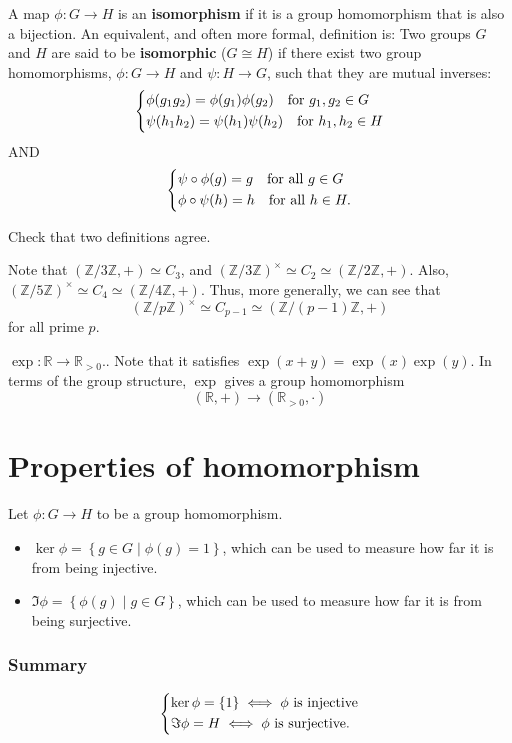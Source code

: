 \begin{definition}
A map $\phi: G \to H$ is an \textbf{isomorphism} if it is a group homomorphism that is also a bijection. An equivalent, and often more formal, definition is:
Two groups $G$ and $H$ are said to be \textbf{isomorphic} ($G \cong H$) if there exist two group homomorphisms, $\phi: G \to H$ and $\psi: H \to G$, such that they are mutual inverses:
\[
    \begin{dcases}
        \phi (g_1 g_2) = \phi (g_1) \phi (g_2) \quad \text{for } g_1, g_2 \in G \\
        \psi (h_1 h_2) = \psi (h_1) \psi (h_2) \quad \text{for } h_1, h_2 \in H
    \end{dcases}
\]
AND
\[
    \begin{dcases}
        \psi \circ \phi (g) = g \quad \text{for all } g \in G \\
        \phi \circ \psi (h) = h \quad \text{for all } h \in H.
    \end{dcases}
\]
\end{definition}

\begin{exercise}
    Check that two definitions agree.
\end{exercise}

Note that \((\mathbb{Z} / 3 \mathbb{Z}, +) \simeq C_3\), and \((\mathbb{Z} / 3 \mathbb{Z} )^{\times } \simeq C_2 \simeq (\mathbb{Z} / 2 \mathbb{Z} , +)\).  Also, \((\mathbb{Z} / 5 \mathbb{Z} )^{\times } \simeq C_4 \simeq (\mathbb{Z} / 4 \mathbb{Z} , +)\). Thus, more generally, we can see that 
\[
    (\mathbb{Z} / p \mathbb{Z} )^{\times } \simeq C_{p-1} \simeq (\mathbb{Z}  / (p-1) \mathbb{Z} , +)
\] for all prime \(p\). 

\begin{eg}
\(\exp : \mathbb{R} \to \mathbb{R} _{>0}.\). Note that it satisfies \(\exp (x+y)=\exp (x)\exp (y)\). In terms of the group structure, \(\exp \) gives a group homomorphism
\[
    (\mathbb{R} , +) \to (\mathbb{R} _{>0}, \cdot)
\]   
\end{eg}

\section{Properties of homomorphism}
\begin{definition}
    Let \(\phi : G \to H\) to be a group homomorphism. 
    \begin{itemize}
        \item \(\ker \phi = \left\{ g \in G \mid \phi (g) = 1 \right\} \), which can be used to measure how far it is from being injective. 
        \item \(\Im \phi = \left\{\phi (g) \mid g \in G  \right\} \), which can be used to measure how far it is from being surjective. 
    \end{itemize} 
\end{definition}

\subsubsection{Summary}
\[
    \begin{dcases}
        \ker \phi = \left\{ 1 \right\} \iff \phi \text{ is injective} \\
        \Im \phi = H \iff \phi \text{ is surjective}. 
    \end{dcases}
\]